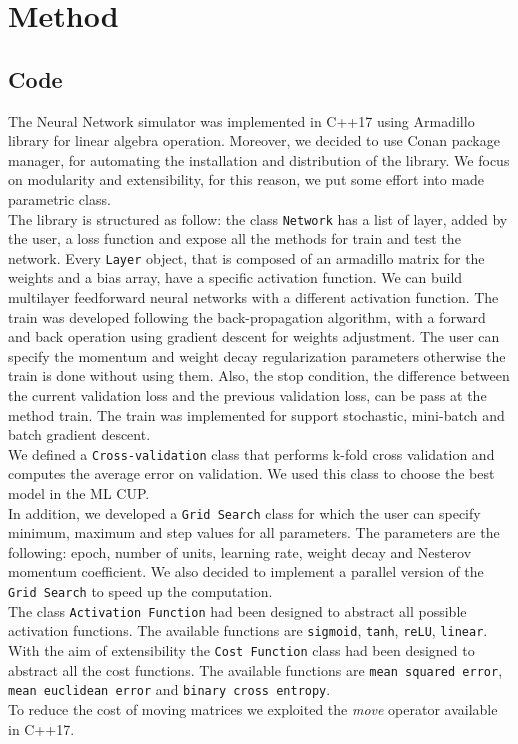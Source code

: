 \section{Method}

\subsection{Code}
The Neural Network simulator was implemented in C++17 using Armadillo library for linear algebra operation. Moreover, we decided to use Conan package manager, for automating the installation and distribution of the library. We focus on modularity and extensibility, for this reason, we put some effort into made parametric class.
\\
The library is structured as follow:
the class \texttt{Network} has a list of layer, added by the user, a loss function and expose all the methods for train and test the network. Every \texttt{Layer} object, that is composed of an armadillo matrix for the weights and a bias array, have a specific activation function. We can build  multilayer feedforward neural networks with a different activation function. The train was developed following the back-propagation algorithm, with a forward and back operation using gradient descent for weights adjustment. The user can specify the momentum and weight decay regularization parameters otherwise the train is done without using them. Also, the stop condition, the difference between the current validation loss and the previous validation loss, can be pass at the method train. The train was implemented for support stochastic, mini-batch and batch gradient descent.
\\
We defined a \texttt{Cross-validation} class that performs k-fold cross validation and computes the average error on validation. We used this class to choose the best model in the ML CUP.
\\
In addition, we developed a \texttt{Grid Search} class for which the user can specify minimum, maximum and step values for all parameters. The parameters are the following: epoch, number of units, learning rate, weight decay and Nesterov momentum coefficient. We also decided to implement a parallel version of the \texttt{Grid Search} to speed up the computation. 
\\
The class \texttt{Activation Function} had been designed to abstract all possible activation functions. The available functions are \texttt{sigmoid}, \texttt{tanh}, \texttt{reLU}, \texttt{linear}.
With the aim of extensibility the \texttt{Cost Function} class had been designed to abstract all the cost functions.
The available functions are \texttt{mean squared error}, \texttt{mean euclidean error} and \texttt{binary cross entropy}.
\\
To reduce the cost of moving matrices we exploited the \textit{move} operator available in C++17.

